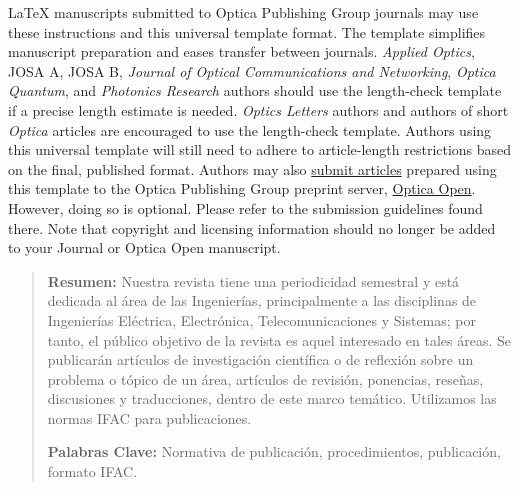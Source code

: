 \documentclass[10pt]{article}
\author{\fontsize{10}{12}\selectfont \textbf{\fontsize{10}{12}\selectfont PhD. Autor Principal, Msc. Co-Autor I,} \\ \textbf{\fontsize{10}{12}\selectfont Msc. Co-Autor II}\\ \\
\small{\textbf{\fontsize{10}{12}\selectfont Universidad de Pamplona}}\\
\small{\fontsize{10}{12}\selectfont Comité Editorial Revista Colombiana de Tecnologías de Avanzada}\\
\small{\fontsize{10}{12}\selectfont Ciudadela Universitaria. Pamplona, Norte de Santander, Colombia.} \\ \small{\fontsize{10}{12}\selectfont Tel.: 57-7-5685303, Fax: 57-7-5685303, Ext. 144}\\
\small{\fontsize{10}{12}\selectfont E-mail: \{correo1,correo2,correo3\}@unipamplona.edu.co}
}
\date{\vspace{-6mm}}
\begin{document}
\fontsize{10}{12}\selectfont


\def\tablename{Tabla}%

\setlength{\parskip}{0mm}

\maketitle

\setlength{\parskip}{3mm}


\renewcommand\abstractname{}

\begin{abstract*} 
    \LaTeX{} manuscripts submitted to Optica Publishing Group journals may use these instructions and this universal template format. The template simplifies manuscript preparation and eases transfer between journals. \emph{Applied Optics}, JOSA A, JOSA B, \emph{Journal of Optical Communications and Networking}, \emph{Optica Quantum}, and \emph{Photonics Research} authors should use the length-check template if a precise length estimate is needed. \emph{Optics Letters} authors and authors of short \emph{Optica} articles are encouraged to use the length-check template. Authors using this universal template will still need to adhere to article-length restrictions based on the final, published format. Authors may also \href{https://opticaopen.org}{submit articles} prepared using this template to the Optica Publishing Group preprint server, \href{https://preprints.opticaopen.org}{Optica Open}. However, doing so is optional. Please refer to the submission guidelines found there. Note that copyright and licensing information should no longer be added to your Journal or Optica Open manuscript.
    
\end{abstract*}


\renewcommand\abstractname{}

\begin{abstract}
    \fontsize{10}{12}\selectfont
    \textbf{Resumen:} Nuestra revista tiene una periodicidad semestral y está dedicada al área de las Ingenierías, principalmente a las disciplinas de Ingenierías Eléctrica, Electrónica, Telecomunicaciones y Sistemas; por tanto, el público objetivo de la revista es aquel interesado en tales áreas. Se publicarán artículos de investigación científica o de reflexión sobre un problema o tópico de un área, artículos de revisión, ponencias, reseñas, discusiones y traducciones, dentro de este marco temático. Utilizamos las normas IFAC para publicaciones.

    \vspace{3mm}
    
    \textbf{Palabras Clave:} Normativa de publicación, procedimientos, publicación, formato IFAC.
\end{abstract}
\end{document}

